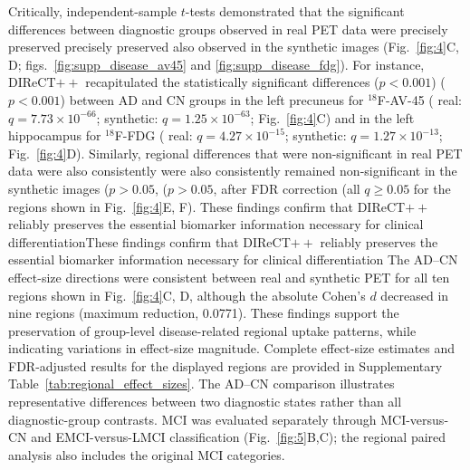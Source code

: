 \documentclass{article}
\providecommand{\DIFaddtex}[1]{{\protect\color{blue} \sf #1}} %
\providecommand{\DIFdeltex}[1]{{\protect\color{red} \ifmmode #1\else\scriptsize #1\fi}} %
\providecommand{\DIFaddbegin}{} %
\providecommand{\DIFaddend}{} %
\providecommand{\DIFdelbegin}{} %
\providecommand{\DIFdelend}{} %
\providecommand{\DIFadd}[1]{\texorpdfstring{\DIFaddtex{#1}}{#1}} %
\providecommand{\DIFdel}[1]{\texorpdfstring{\DIFdeltex{#1}}{}} %
\newcommand{\DIFscaledelfig}{0.5}
\newlength{\DIFdelgraphicswidth} %
\newlength{\DIFdelgraphicsheight} %
\newcommand{\DIFaddincludegraphics}[2][]{{\color{blue}\fbox{\DIFOincludegraphics[#1]{#2}}}} %
\newcommand{\DIFdelincludegraphics}[2][]{%
\sbox{\DIFdelgraphicsbox}{\DIFOincludegraphics[#1]{#2}}%
\settoboxwidth{\DIFdelgraphicswidth}{\DIFdelgraphicsbox} %
\settoboxtotalheight{\DIFdelgraphicsheight}{\DIFdelgraphicsbox} %
\scalebox{\DIFscaledelfig}{%
\parbox[b]{\DIFdelgraphicswidth}{\usebox{\DIFdelgraphicsbox}\\[-\baselineskip] \rule{\DIFdelgraphicswidth}{0em}}\llap{\resizebox{\DIFdelgraphicswidth}{\DIFdelgraphicsheight}{%
\setlength{\unitlength}{\DIFdelgraphicswidth}%
\begin{picture}(1,1)%
\thicklines\linethickness{2pt} %
{\color[rgb]{1,0,0}\put(0,0){\framebox(1,1){}}}%
{\color[rgb]{1,0,0}\put(0,0){\line( 1,1){1}}}%
{\color[rgb]{1,0,0}\put(0,1){\line(1,-1){1}}}%
\end{picture}%
}\hspace*{3pt}}} %
} %
\DeclareRobustCommand{\DIFaddbegin}{\DIFOaddbegin \let\includegraphics\DIFaddincludegraphics} %
\DeclareRobustCommand{\DIFaddend}{\DIFOaddend \let\includegraphics\DIFOincludegraphics} %
\DeclareRobustCommand{\DIFdelbegin}{\DIFOdelbegin \let\includegraphics\DIFdelincludegraphics} %
\DeclareRobustCommand{\DIFdelend}{\DIFOaddend \let\includegraphics\DIFOincludegraphics} %
\begin{document}
Critically, independent-sample $t$-tests demonstrated that the significant differences between diagnostic groups observed in real PET data were \DIFdelbegin \DIFdel{precisely preserved }\DIFdelend \DIFaddbegin \DIFadd{also observed }\DIFaddend in the synthetic images (Fig.~\ref{fig:4}C, D; figs.~\ref{fig:supp_disease_av45} and \ref{fig:supp_disease_fdg}). For instance, DIReCT$++$ recapitulated the statistically significant differences \DIFdelbegin \DIFdel{($p<0.001$) }\DIFdelend between AD and CN groups in the \DIFaddbegin \DIFadd{left }\DIFaddend precuneus for $^{18}$F-AV-45 (\DIFaddbegin \DIFadd{real: $q=7.73\times10^{-66}$; synthetic: $q=1.25\times10^{-63}$; }\DIFaddend Fig.~\ref{fig:4}C) and in the \DIFaddbegin \DIFadd{left }\DIFaddend hippocampus for $^{18}$F-FDG (\DIFaddbegin \DIFadd{real: $q=4.27\times10^{-15}$; synthetic: $q=1.27\times10^{-13}$; }\DIFaddend Fig.~\ref{fig:4}D). Similarly, regional differences that were non-significant in real PET data \DIFdelbegin \DIFdel{were also consistently }\DIFdelend \DIFaddbegin \DIFadd{remained }\DIFaddend non-significant in the synthetic images \DIFdelbegin \DIFdel{($p>0.05$, }\DIFdelend \DIFaddbegin \DIFadd{after FDR correction (all $q\geq0.05$ for the regions shown in }\DIFaddend Fig.~\ref{fig:4}E, F). \DIFdelbegin \DIFdel{These findings confirm that DIReCT$++$ reliably preserves the essential biomarker information necessary for clinical differentiation}\DIFdelend \DIFaddbegin \DIFadd{The AD--CN effect-size directions were consistent between real and synthetic PET for all ten regions shown in Fig.~\ref{fig:4}C, D, although the absolute Cohen's $d$ decreased in nine regions (maximum reduction, 0.0771). These findings support the preservation of group-level disease-related regional uptake patterns, while indicating variations in effect-size magnitude. Complete effect-size estimates and FDR-adjusted results for the displayed regions are provided in Supplementary Table~\ref{tab:regional_effect_sizes}. The AD--CN comparison illustrates representative differences between two diagnostic states rather than all diagnostic-group contrasts. MCI was evaluated separately through MCI-versus-CN and EMCI-versus-LMCI classification (Fig.~\ref{fig:5}B,C); the regional paired analysis also includes the original MCI categories}\DIFaddend .
\end{document}
